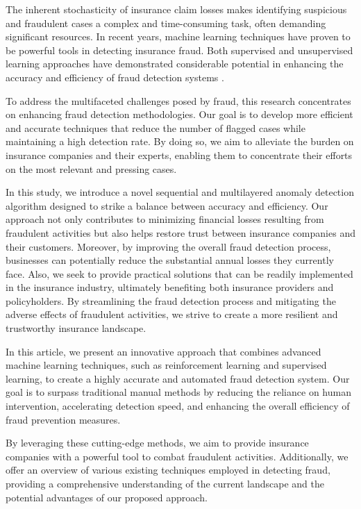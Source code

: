 \documentclass[12pt]{article}
\begin{document}
The inherent stochasticity of insurance claim losses makes
identifying suspicious and fraudulent cases a complex and
time-consuming task, often demanding significant resources. In recent years, machine learning techniques have
proven to be powerful tools in detecting insurance fraud. Both
supervised and unsupervised learning approaches have demonstrated
considerable potential in enhancing the accuracy and efficiency of
fraud detection systems \cite{A61}.



To address the multifaceted challenges posed by fraud, this
research concentrates on enhancing fraud detection methodologies.
Our goal is to develop more efficient and accurate techniques that
reduce the number of flagged cases while maintaining a high
detection rate. By doing so, we aim to alleviate the burden on
insurance companies and their experts, enabling them to
concentrate their efforts on the most relevant and pressing cases.

In this study, we introduce a novel sequential and multilayered
anomaly detection algorithm designed to strike a balance between
accuracy and efficiency. Our approach not only contributes to
minimizing financial losses resulting from fraudulent activities
but also helps restore trust between insurance companies and their
customers. Moreover, by improving the overall fraud detection
process, businesses can potentially reduce the substantial annual
losses they currently face. Also, we seek to provide practical
solutions that can be readily implemented in the insurance
industry, ultimately benefiting both insurance providers and
policyholders. By streamlining the fraud detection process and
mitigating the adverse effects of fraudulent activities, we strive
to create a more resilient and trustworthy insurance landscape.


In this article, we present an innovative approach that combines
advanced machine learning techniques, such as reinforcement
learning and supervised learning, to create a highly accurate and
automated fraud detection system. Our goal is to surpass
traditional manual methods by reducing the reliance on human
intervention, accelerating detection speed, and enhancing the
overall efficiency of fraud prevention measures.

By leveraging these cutting-edge methods, we aim to provide
insurance companies with a powerful tool to combat fraudulent
activities. Additionally, we offer an overview of various existing
techniques employed in detecting fraud, providing a comprehensive
understanding of the current landscape and the potential
advantages of our proposed approach.
\end{document}
